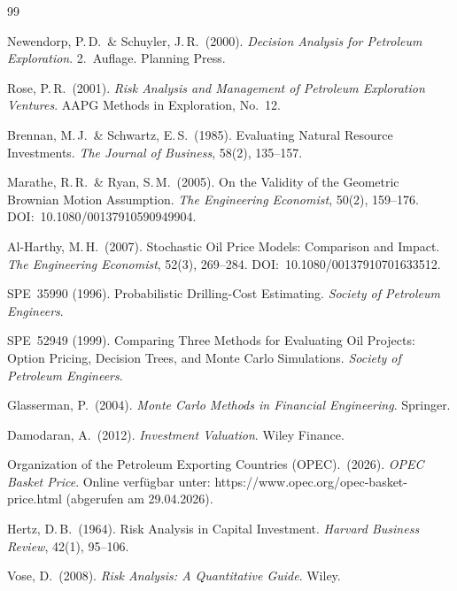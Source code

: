 \documentclass[11pt,a4paper]{article}
\begin{document}
\begin{thebibliography}{99}

Newendorp, P.\,D.\ \& Schuyler, J.\,R.\ (2000).
\textit{Decision Analysis for Petroleum Exploration}.
2.~Auflage. Planning Press.

Rose, P.\,R.\ (2001).
\textit{Risk Analysis and Management of Petroleum Exploration Ventures}.
AAPG Methods in Exploration, No.~12.

Brennan, M.\,J.\ \& Schwartz, E.\,S.\ (1985).
Evaluating Natural Resource Investments.
\textit{The Journal of Business}, 58(2), 135--157.

Marathe, R.\,R.\ \& Ryan, S.\,M.\ (2005).
On the Validity of the Geometric Brownian Motion Assumption.
\textit{The Engineering Economist}, 50(2), 159--176.
DOI:~10.1080/00137910590949904.

Al-Harthy, M.\,H.\ (2007).
Stochastic Oil Price Models: Comparison and Impact.
\textit{The Engineering Economist}, 52(3), 269--284.
DOI:~10.1080/00137910701633512.

SPE~35990 (1996).
Probabilistic Drilling-Cost Estimating.
\textit{Society of Petroleum Engineers}.

SPE~52949 (1999).
Comparing Three Methods for Evaluating Oil Projects: Option Pricing, Decision Trees, and Monte Carlo Simulations.
\textit{Society of Petroleum Engineers}.


Glasserman, P.\ (2004).
\textit{Monte Carlo Methods in Financial Engineering}.
Springer.

Damodaran, A.\ (2012).
\textit{Investment Valuation}.
Wiley Finance.

Organization of the Petroleum Exporting Countries (OPEC).\ (2026).
\textit{OPEC Basket Price}.
Online verfügbar unter: https://www.opec.org/opec-basket-price.html (abgerufen am 29.04.2026).

Hertz, D.\,B.\ (1964).
Risk Analysis in Capital Investment.
\textit{Harvard Business Review}, 42(1), 95--106.

Vose, D.\ (2008).
\textit{Risk Analysis: A Quantitative Guide}.
Wiley.


\end{thebibliography}
\end{document}
